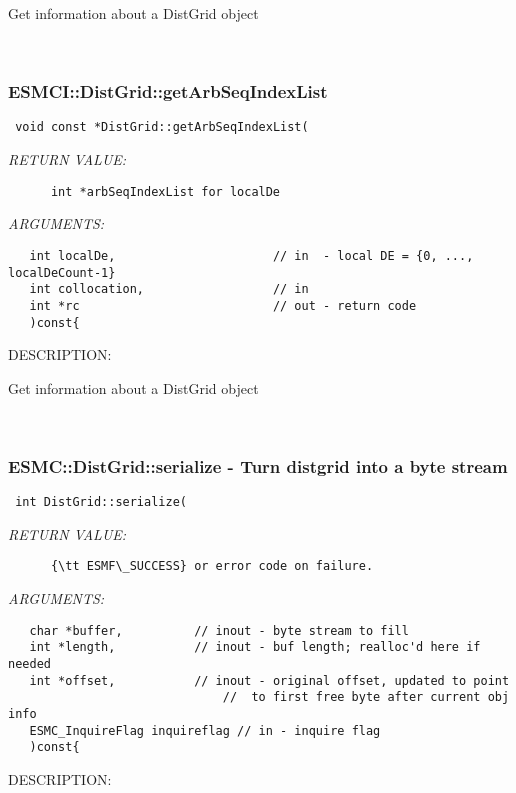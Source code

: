      Get information about a DistGrid object
   
 
\mbox{}\hrulefill\
 
\subsubsection [ESMCI::DistGrid::getArbSeqIndexList] {ESMCI::DistGrid::getArbSeqIndexList}


  
\begin{verbatim} void const *DistGrid::getArbSeqIndexList(\end{verbatim}{\em RETURN VALUE:}
\begin{verbatim}      int *arbSeqIndexList for localDe\end{verbatim}{\em ARGUMENTS:}
\begin{verbatim}   int localDe,                      // in  - local DE = {0, ..., localDeCount-1}
   int collocation,                  // in
   int *rc                           // out - return code
   )const{\end{verbatim}
{\sf DESCRIPTION:\\ }


      Get information about a DistGrid object
   
 
\mbox{}\hrulefill\
 
\subsubsection [ESMC::DistGrid::serialize] {ESMC::DistGrid::serialize - Turn distgrid into a byte stream}


  
\begin{verbatim} int DistGrid::serialize(\end{verbatim}{\em RETURN VALUE:}
\begin{verbatim}      {\tt ESMF\_SUCCESS} or error code on failure.\end{verbatim}{\em ARGUMENTS:}
\begin{verbatim}   char *buffer,          // inout - byte stream to fill
   int *length,           // inout - buf length; realloc'd here if needed
   int *offset,           // inout - original offset, updated to point 
                              //  to first free byte after current obj info
   ESMC_InquireFlag inquireflag // in - inquire flag
   )const{\end{verbatim}
{\sf DESCRIPTION:\\ }


